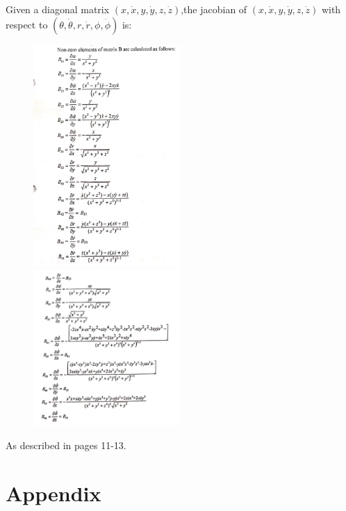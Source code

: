 \documentclass{article}
\newcommand{\rrate}{\dot{r}}
\newcommand{\brate}{\dot{\theta}}
\newcommand{\erate}{\dot{\phi}}
\begin{document}
Given a diagonal matrix $(x,\dot{x},y,\dot{y},z,\dot{z})$,the jacobian of
$(x,\dot{x},y,\dot{y},z,\dot{z})$ with respect to $(\theta,\brate, r, \rrate, \phi, \erate)$ is:


\begin{figure}[H]\label{fig:spherical}
\includegraphics[width=0.5\textwidth,height=0.5\textheight,keepaspectratio]{figures/spherical-covariance1}
\includegraphics[width=0.5\textwidth,height=0.5\textheight,keepaspectratio]{figures/spherical-covariance2}
\end{figure}

As described in pages 11-13.



\section{Appendix}

\end{document}
